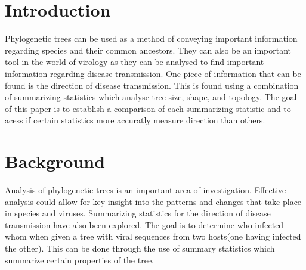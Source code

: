\documentclass[final,5p,times,twocolumn,authoryear]{elsarticle}
\begin{document}
\begin{frontmatter}



\end{frontmatter}




\section{Introduction}
\label{introduction}

Phylogenetic trees can be used as a method of conveying important information regarding species and their common ancestors. They can also be an important tool in the world of virology as they can be analysed to find important information regarding disease transmission. One piece of information that can be found is the direction of disease transmission. This is found using a combination of summarizing statistics which analyse tree size, shape, and topology. The goal of this paper is to establish a comparison of each summarizing statistic and to acess if certain statistics more accuratly measure direction than others.

\section{Background}
\label{background}

Analysis of phylogenetic trees is an important area of investigation. Effective analysis could allow for key insight into the patterns and changes that take place in species and viruses. Summarizing statistics for the direction of disease transmission have also been explored. The goal is to determine who-infected-whom when given a tree with viral sequences from two hosts(one having infected the other). This can be done through the use of summary statistics which summarize certain properties of the tree.
\end{document}
